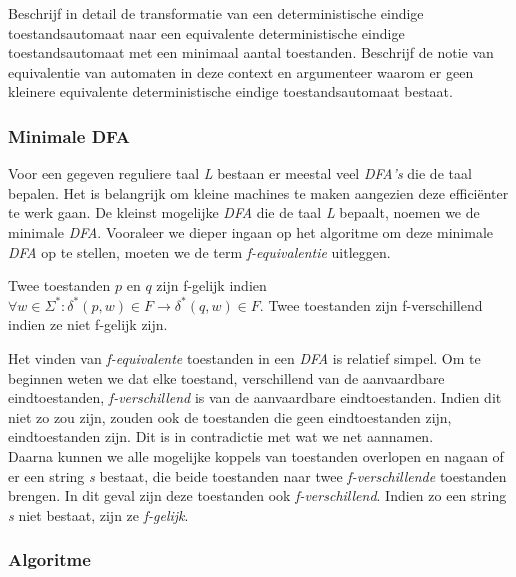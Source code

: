 \begin{quest}
Beschrijf in detail de transformatie van een deterministische eindige toestandsautomaat naar een equivalente deterministische eindige toestandsautomaat met een minimaal aantal toestanden. Beschrijf de notie van equivalentie van automaten in deze context en argumenteer waarom er geen kleinere equivalente deterministische eindige toestandsautomaat bestaat.
\end{quest}

\subsubsection*{Minimale DFA}

Voor een gegeven reguliere taal \emph{L} bestaan er meestal veel \emph{DFA's} die de taal bepalen. Het is belangrijk om kleine machines te maken aangezien deze effici\"enter te werk gaan. De kleinst mogelijke \emph{DFA} die de taal \emph{L} bepaalt, noemen we de minimale \emph{DFA}. Vooraleer we dieper ingaan op het algoritme om deze minimale \emph{DFA} op te stellen, moeten we de term \emph{f-equivalentie} uitleggen.

\begin{theorem}[f-equivalentie]
	Twee toestanden $p$ en $q$ zijn f-gelijk indien $\forall w \in \Sigma^*:\delta^*(p,w) \in F \rightarrow \delta^*(q,w) \in F$. Twee toestanden zijn f-verschillend indien ze niet f-gelijk zijn.
\end{theorem}

Het vinden van \emph{f-equivalente} toestanden in een \emph{DFA} is relatief simpel. Om te beginnen weten we dat elke toestand, verschillend van de aanvaardbare eindtoestanden, \emph{f-verschillend} is van de aanvaardbare eindtoestanden. Indien dit niet zo zou zijn, zouden ook de toestanden die geen eindtoestanden zijn, eindtoestanden zijn. Dit is in contradictie met wat we net aannamen.\\

Daarna kunnen we alle mogelijke koppels van toestanden overlopen en nagaan of er een string \emph{s} bestaat, die beide toestanden naar twee \emph{f-verschillende} toestanden brengen. In dit geval zijn deze toestanden ook \emph{f-verschillend}. Indien zo een string \emph{s} niet bestaat, zijn ze \emph{f-gelijk}.

\subsubsection*{Algoritme}

